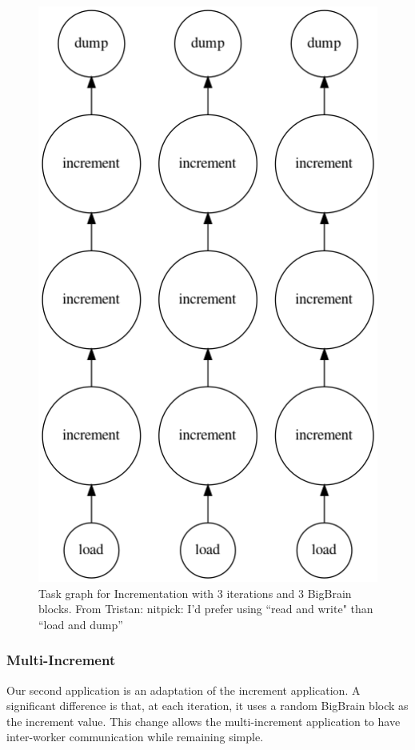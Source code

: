 \documentclass[conference]{IEEEtran}
\newcommand{\TG}[1]{\color{cyan}From Tristan: #1 \color{black}}
\begin{document}
\begin{figure}[!ht]
	\centering
	\includegraphics[height=\columnwidth,
	angle=0]{figures/increment.png}
	\caption{Task graph for Incrementation with 3 iterations and 3 BigBrain blocks.
	\TG{nitpick: I'd prefer using ``read and write" than ``load and dump''}}
	\label{fig:graph-increment}
\end{figure}

% 
\subsubsection{Multi-Increment}
Our second application is an adaptation of the increment application. A
significant difference is that, at each iteration, it uses a random
BigBrain block as the increment value. This change allows the
multi-increment application to have inter-worker communication while
remaining simple.
\end{document}
